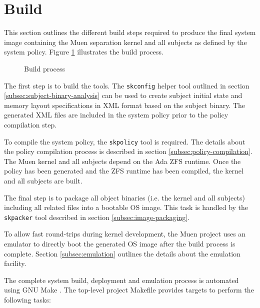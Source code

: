 \section{Build}\label{sec:build}
This section outlines the different build steps required to produce the final
system image containing the Muen separation kernel and all subjects as defined
by the system policy. Figure \ref{fig:build-process} illustrates the
build process.

\begin{figure}[h]
	\centering
	
	\caption{Build process}
	\label{fig:build-process}
\end{figure}

The first step is to build the tools. The \texttt{skconfig} helper tool
outlined in section \ref{subsec:subject-binary-analysis} can be used to create
subject initial state and memory layout specifications in XML format based on
the subject binary. The generated XML files are included in the system policy
prior to the policy compilation step.

To compile the system policy, the \texttt{skpolicy} tool is required. The
details about the policy compilation process is described in section
\ref{subsec:policy-compilation}. The Muen kernel and all subjects depend on the
Ada ZFS runtime. Once the policy has been generated and the ZFS runtime has
been compiled, the kernel and all subjects are built.

The final step is to package all object binaries (i.e. the kernel and all
subjects) including all related files into a bootable OS image. This task is
handled by the \texttt{skpacker} tool described in section
\ref{subsec:image-packaging}.

To allow fast round-trips during kernel development, the Muen project uses
an emulator to directly boot the generated OS image after the build process is
complete. Section \ref{subsec:emulation} outlines the details about the
emulation facility.

The complete system build, deployment and emulation process is automated using
GNU Make \cite{make}. The top-level project Makefile provides targets to
perform the following tasks:


